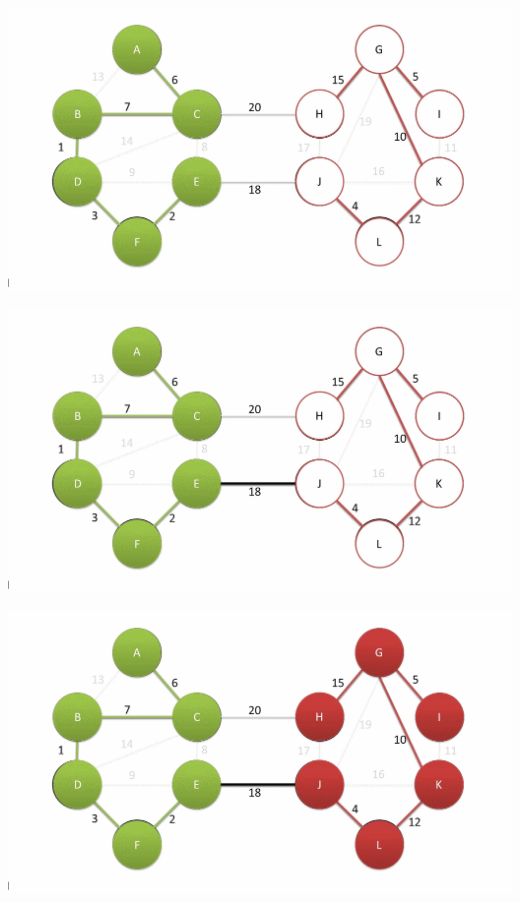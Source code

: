 \documentclass[
	11pt, %
]{beamer}
\begin{document}
\begin{frame}
    \includegraphics[width = 1\textwidth]{baruvka-example/frame_30_delay-1s.png}
\end{frame}
\begin{frame}
    \includegraphics[width = 1\textwidth]{baruvka-example/frame_31_delay-1s.png}
\end{frame}
\begin{frame}
    \includegraphics[width = 1\textwidth]{baruvka-example/frame_32_delay-2s.png}
\end{frame}
\end{document}
